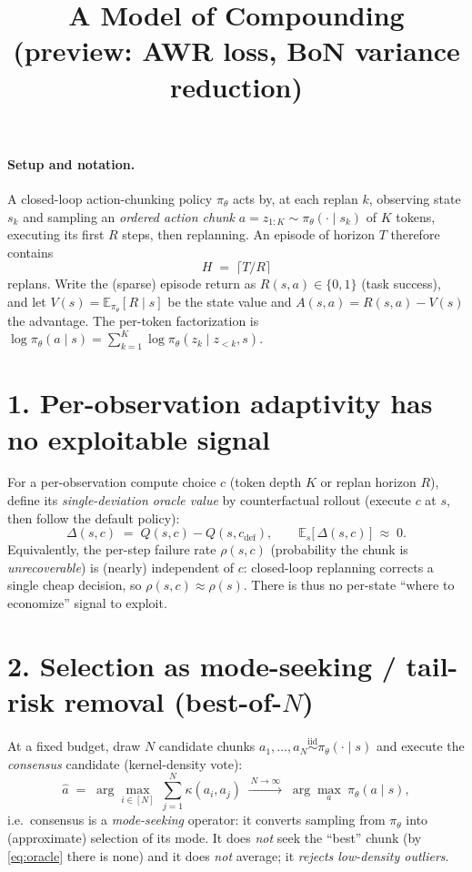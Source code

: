 \documentclass[11pt]{article}
\title{\vspace{-2em}A Model of Compounding\\ \large (preview: AWR loss, BoN variance reduction)}
\date{}
\newcommand{\E}{\mathbb{E}}
\newcommand{\R}{R}
\begin{document}
\maketitle

\paragraph{Setup and notation.}
A closed-loop action-chunking policy $\pi_\theta$ acts by, at each replan $k$, observing state
$s_k$ and sampling an \emph{ordered action chunk} $a=z_{1:K}\sim\pi_\theta(\cdot\mid s_k)$ of $K$
tokens, executing its first $R$ steps, then replanning. An episode of horizon $T$ therefore
contains
\begin{equation}
  H \;=\; \big\lceil T/R \big\rceil
  \label{eq:H}
\end{equation}
replans. Write the (sparse) episode return as $\R(s,a)\in\{0,1\}$ (task success), and let
$V(s)=\E_{\pi_\theta}[\R\mid s]$ be the state value and $A(s,a)=\R(s,a)-V(s)$ the advantage. The
per-token factorization is $\log\pi_\theta(a\mid s)=\sum_{k=1}^{K}\log\pi_\theta(z_k\mid z_{<k},s)$.

\section*{1. Per-observation adaptivity has no exploitable signal}
For a per-observation compute choice $c$ (token depth $K$ or replan horizon $R$), define its
\emph{single-deviation oracle value} by counterfactual rollout (execute $c$ at $s$, then follow
the default policy):
\begin{equation}
  \Delta(s,c)\;=\;Q(s,c)-Q(s,c_{\text{def}}),\qquad
  \E_{s}\big[\,\Delta(s,c)\,\big]\;\approx\;0 .
  \label{eq:oracle}
\end{equation}
Equivalently, the per-step failure rate $\rho(s,c)$ (probability the chunk is
\emph{unrecoverable}) is (nearly) independent of $c$: closed-loop replanning corrects a single
cheap decision, so $\rho(s,c)\approx\rho(s)$. There is thus no per-state ``where to economize''
signal to exploit.

\section*{2. Selection as mode-seeking / tail-risk removal (best-of-$N$)}
At a fixed budget, draw $N$ candidate chunks $a_1,\dots,a_N\stackrel{\text{iid}}{\sim}\pi_\theta(\cdot\mid s)$
and execute the \emph{consensus} candidate (kernel-density vote):
\begin{equation}
  \hat a \;=\; \arg\max_{i\in[N]}\ \sum_{j=1}^{N}\kappa\!\left(a_i,a_j\right)
  \;\xrightarrow{\,N\to\infty\,}\; \arg\max_{a}\ \pi_\theta(a\mid s),
  \label{eq:vote}
\end{equation}
i.e.\ consensus is a \emph{mode-seeking} operator: it converts sampling from $\pi_\theta$ into
(approximate) selection of its mode. It does \emph{not} seek the ``best'' chunk (by
\eqref{eq:oracle} there is none) and it does \emph{not} average; it \emph{rejects low-density
outliers}.
\end{document}
